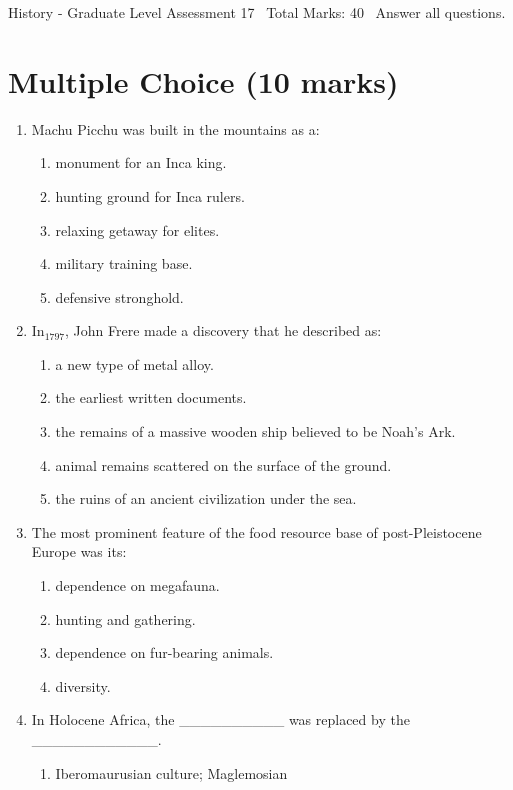 \documentclass[12pt]{article}
\begin{document}
\begin{center}
History - Graduate Level Assessment 17 \
Total Marks: 40 \
Answer all questions.
\end{center}

\section*{Multiple Choice (10 marks)}
\begin{enumerate}[label=\arabic*.]
\item Machu Picchu was built in the mountains as a:
\begin{enumerate}[label=(\alph*)]
    \item monument for an Inca king.
    \item hunting ground for Inca rulers.
    \item relaxing getaway for elites.
    \item military training base.
    \item defensive stronghold.
\end{enumerate}
\item In$_{1797}$, John Frere made a discovery that he described as:
\begin{enumerate}[label=(\alph*)]
    \item a new type of metal alloy.
    \item the earliest written documents.
    \item the remains of a massive wooden ship believed to be Noah's Ark.
    \item animal remains scattered on the surface of the ground.
    \item the ruins of an ancient civilization under the sea.
\end{enumerate}
\item The most prominent feature of the food resource base of post-Pleistocene Europe was its:
\begin{enumerate}[label=(\alph*)]
    \item dependence on megafauna.
    \item hunting and gathering.
    \item dependence on fur-bearing animals.
    \item diversity.
\end{enumerate}
\item In Holocene Africa, the \_\_\_\_\_\_\_\_\_\_ was replaced by the \_\_\_\_\_\_\_\_\_\_\_\_.
\begin{enumerate}[label=(\alph*)]
    \item Iberomaurusian culture; Maglemosian

\end{enumerate}
\end{enumerate}
\end{document}
